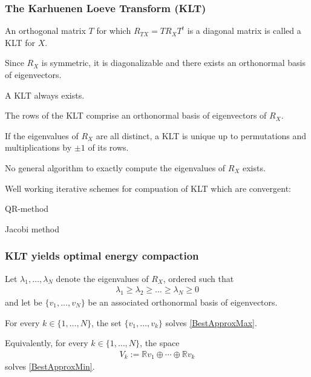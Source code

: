 \begin{frame} \frametitle{The Karhuenen Loeve Transform (KLT)}
\bit
\item An orthogonal matrix $T$ for which 
$R_{TX}=TR_{X}T^t$ is a diagonal matrix is called a KLT for $X$. 
\item Since $R_X$ is symmetric, it is diagonalizable and there exists an orthonormal basis of eigenvectors. 
\item [\iarrow] A KLT always exists.
\eit
{}
\bit 
\item The rows of the KLT comprise an orthonormal basis of eigenvectors of $R_X$. 
\item If the eigenvalues of $R_X$ are all distinct, a KLT is unique up to permutations and multiplications by $\pm 1$ of its rows. 
\item No general algorithm to exactly compute the eigenvalues of $R_X$ exists.
\item Well working iterative schemes for compuation of KLT which are convergent:
\bit 
\item QR-method 
\item Jacobi method
\eit
\eit
\end{frame}

\begin{frame}\frametitle{KLT yields optimal energy compaction}
\begin{proposition}\label{TheoremKLTEnergy}
Let $\lambda_1,\dots,\lambda_N$ denote the eigenvalues of $R_X$, ordered such that 
\begin{align*}
\lambda_1\geq \lambda_2\geq\dots\geq \lambda_N\geq 0
\end{align*}
and let be $\{v_1,\dots,v_N\}$ be an associated orthonormal basis of eigenvectors.
\bit
\item For every $k\in\{1,\dots,N\}$, the set $\{v_1,\dots,v_k\}$ solves  \eqref{BestApproxMax}. 
\item Equivalently, for 
every $k\in\{1,\dots,N\}$, the space 
\begin{align*}
V_k:=\mathbb{R}v_1\oplus\cdots\oplus\mathbb{R}v_k
\end{align*}
solves \eqref{BestApproxMin}.
\eit
\end{proposition}
\end{frame}

